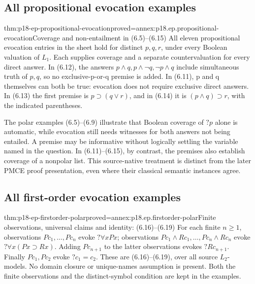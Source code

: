 \subsection{All propositional evocation examples}

\begin{hbtheorem}{thm:p18-ep-propositional-evocation}{proved=annex:p18.ep.propositional-evocation}{Coverage and non-entailment in (6.5)--(6.15)}
All eleven propositional evocation entries in the sheet hold for distinct
\(p,q,r\), under every Boolean valuation of \(L_1\).
Each supplies coverage and a separate countervaluation for every direct
answer. In (6.12), the answers \(p\land q,p\land\neg q,\neg p\land q\)
include simultaneous truth of \(p,q\), so no exclusive-p-or-q premise
is added. In (6.11), p and q themselves can both be true: evocation
does not require exclusive direct answers. In (6.13) the first premise is
\(p\supset(q\lor r)\), and in (6.14) it is
\((p\land q)\supset r\), with the indicated parentheses.
\end{hbtheorem}

The polar examples (6.5)--(6.9) illustrate that Boolean coverage of
\(?p\) alone is automatic, while evocation still needs witnesses for
both answers not being entailed. A premise may be informative without
logically settling the variable named in the question. In (6.11)--(6.15),
by contrast, the premises also establish coverage of a nonpolar list.
This source-native treatment is distinct from the later PMCE proof
presentation, even where their classical semantic instances agree.

\subsection{All first-order evocation examples}

\begin{hbtheorem}{thm:p18-ep-firstorder-polar}{proved=annex:p18.ep.firstorder-polar}{Finite observations, universal claims and identity: (6.16)--(6.19)}
For each finite \(n\geq1\), observations \(Pc_1,\ldots,Pc_n\)
evoke \(?\forall xPx\); observations
\(Pc_1\land Rc_1,\ldots,Pc_n\land Rc_n\) evoke
\(?\forall x(Px\supset Rx)\). Adding \(Pc_{n+1}\) to the latter
observations evokes \(?Rc_{n+1}\). Finally \(Pc_1,Pc_2\) evoke
\(?c_1=c_2\). These are (6.16)--(6.19), over all source \(L_2\)-models.
No domain closure or unique-names assumption is present. Both the finite
observations and the distinct-symbol condition are kept in the examples.
\end{hbtheorem}

